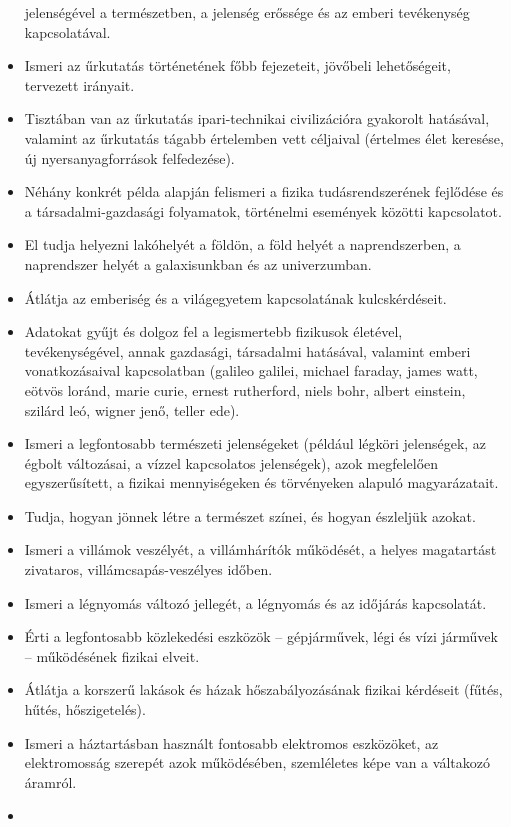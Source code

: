 \begin{itemize}
  jelenségével a természetben, a jelenség erőssége és az emberi
  tevékenység kapcsolatával.
\item
  Ismeri az űrkutatás történetének főbb fejezeteit, jövőbeli
  lehetőségeit, tervezett irányait.
\item
  Tisztában van az űrkutatás ipari-technikai civilizációra gyakorolt
  hatásával, valamint az űrkutatás tágabb értelemben vett céljaival
  (értelmes élet keresése, új nyersanyagforrások felfedezése).
\item
  Néhány konkrét példa alapján felismeri a fizika tudásrendszerének
  fejlődése és a társadalmi-gazdasági folyamatok, történelmi események
  közötti kapcsolatot.
\item
  El tudja helyezni lakóhelyét a földön, a föld helyét a naprendszerben,
  a naprendszer helyét a galaxisunkban és az univerzumban.
\item
  Átlátja az emberiség és a világegyetem kapcsolatának kulcskérdéseit.
\item
  Adatokat gyűjt és dolgoz fel a legismertebb fizikusok életével,
  tevékenységével, annak gazdasági, társadalmi hatásával, valamint
  emberi vonatkozásaival kapcsolatban (galileo galilei, michael faraday,
  james watt, eötvös loránd, marie curie, ernest rutherford, niels bohr,
  albert einstein, szilárd leó, wigner jenő, teller ede).
\item
  Ismeri a legfontosabb természeti jelenségeket (például légköri
  jelenségek, az égbolt változásai, a vízzel kapcsolatos jelenségek),
  azok megfelelően egyszerűsített, a fizikai mennyiségeken és
  törvényeken alapuló magyarázatait.
\item
  Tudja, hogyan jönnek létre a természet színei, és hogyan észleljük
  azokat.
\item
  Ismeri a villámok veszélyét, a villámhárítók működését, a helyes
  magatartást zivataros, villámcsapás-veszélyes időben.
\item
  Ismeri a légnyomás változó jellegét, a légnyomás és az időjárás
  kapcsolatát.
\item
  Érti a legfontosabb közlekedési eszközök -- gépjárművek, légi és vízi
  járművek -- működésének fizikai elveit.
\item
  Átlátja a korszerű lakások és házak hőszabályozásának fizikai
  kérdéseit (fűtés, hűtés, hőszigetelés).
\item
  Ismeri a háztartásban használt fontosabb elektromos eszközöket, az
  elektromosság szerepét azok működésében, szemléletes képe van a
  váltakozó áramról.
\item

\end{itemize}

